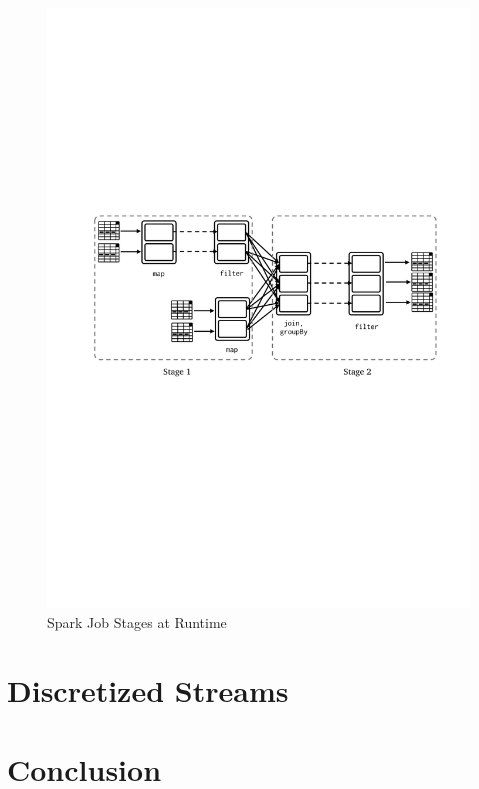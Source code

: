 \begin{figure}[h!]
    \includegraphics[clip,trim=2.3cm 11.4cm 1.7cm 10cm,scale=0.97]{stage-dag.pdf}
    \caption[Spark Job Stages at Runtime]{Spark Job Stages at Runtime}
    \label{fig:sp:dag}
\end{figure}

\clearpage
\section{Discretized Streams}
\label{sp:dstream}

\section{Conclusion}
\label{sp:conc}
